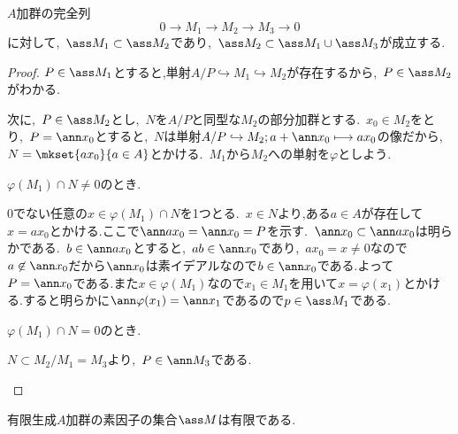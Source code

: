 \begin{prop}\label{prop:完全列とass}
	$A$加群の完全列
	\[0\longrightarrow M_1\longrightarrow M_2\longrightarrow M_3\longrightarrow0\]
	に対して,~$\ass M_1\subset\ass M_2$であり,~$\ass M_2\subset \ass M_1\cup\ass M_3$が成立する.
\end{prop}
\begin{proof}
	$ P\in\ass M_1$とすると,単射$A/ P\hookrightarrow M_1\hookrightarrow M_2$が存在するから,~$ P\in\ass M_2$がわかる.
	
	次に,~$ P\in\ass M_2$とし,~$N$を$A/ P$と同型な$M_2$の部分加群とする.~$x_0\in M_2$をとり,~$ P=\ann x_0$とすると,~$N$は単射$A/ P\hookrightarrow M_2;a+\ann x_0\longmapsto ax_0$の像だから,~$N=\mkset{ax_0}{a\in A}$とかける.~$M_1$から$M_2$への単射を$\varphi$としよう.
	
	\begin{sakura}
		\item $\varphi(M_1)\cap N\neq0$のとき.
		
		0でない任意の$x\in \varphi(M_1)\cap N$を1つとる.~$x\in N$より,ある$a\in A$が存在して$x=ax_0$とかける.ここで$\ann ax_0=\ann x_0= P$を示す.~$\ann x_0\subset\ann ax_0$は明らかである.~$b\in\ann ax_0$とすると,~$ab\in\ann x_0$であり,~$ax_0=x\neq0$なので$a\not\in\ann x_0$だから$\ann x_0$は素イデアルなので$b\in\ann x_0$である.よって$ P=\ann x_0$である.また$x\in \varphi(M_1)$なので$x_1\in M_1$を用いて$x=\varphi(x_1)$とかける.すると明らかに$\ann \varphi(x_1)=\ann x_1$であるので$p\in\ass M_1$である.
		
		\item $\varphi(M_1)\cap N=0$のとき.
		
		$N\subset M_2/M_1=M_3$より,~$ P\in\ann M_3$である.
	\end{sakura}
\end{proof}
\begin{thm}
	有限生成$A$加群の素因子の集合$\ass M$は有限である.
\end{thm}
